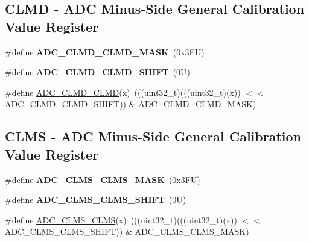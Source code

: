 \subsection*{C\+L\+MD -\/ A\+DC Minus-\/\+Side General Calibration Value Register}
\begin{DoxyCompactItemize}
\item 
\mbox{\label{group___a_d_c___register___masks_ga45c4117ad9fba213c3d338cf6280cb75}} 
\#define {\bfseries A\+D\+C\+\_\+\+C\+L\+M\+D\+\_\+\+C\+L\+M\+D\+\_\+\+M\+A\+SK}~(0x3\+F\+U)
\item 
\mbox{\label{group___a_d_c___register___masks_ga872bf108b50c6dd439ddc1294f104fe5}} 
\#define {\bfseries A\+D\+C\+\_\+\+C\+L\+M\+D\+\_\+\+C\+L\+M\+D\+\_\+\+S\+H\+I\+FT}~(0\+U)
\item 
\#define \mbox{\hyperlink{group___a_d_c___register___masks_ga8066beb7ed493b4d9964fffd3cdefd7a}{A\+D\+C\+\_\+\+C\+L\+M\+D\+\_\+\+C\+L\+MD}}(x)~(((uint32\+\_\+t)(((uint32\+\_\+t)(x)) $<$$<$ A\+D\+C\+\_\+\+C\+L\+M\+D\+\_\+\+C\+L\+M\+D\+\_\+\+S\+H\+I\+FT)) \& A\+D\+C\+\_\+\+C\+L\+M\+D\+\_\+\+C\+L\+M\+D\+\_\+\+M\+A\+SK)
\end{DoxyCompactItemize}
\subsection*{C\+L\+MS -\/ A\+DC Minus-\/\+Side General Calibration Value Register}
\begin{DoxyCompactItemize}
\item 
\mbox{\label{group___a_d_c___register___masks_ga108adc09b24001dddfd498e14213fea6}} 
\#define {\bfseries A\+D\+C\+\_\+\+C\+L\+M\+S\+\_\+\+C\+L\+M\+S\+\_\+\+M\+A\+SK}~(0x3\+F\+U)
\item 
\mbox{\label{group___a_d_c___register___masks_gabe0e92adb89c86d0523958a947288808}} 
\#define {\bfseries A\+D\+C\+\_\+\+C\+L\+M\+S\+\_\+\+C\+L\+M\+S\+\_\+\+S\+H\+I\+FT}~(0\+U)
\item 
\#define \mbox{\hyperlink{group___a_d_c___register___masks_ga83a90dcd2d54b25cc64ad18d6b9d4f07}{A\+D\+C\+\_\+\+C\+L\+M\+S\+\_\+\+C\+L\+MS}}(x)~(((uint32\+\_\+t)(((uint32\+\_\+t)(x)) $<$$<$ A\+D\+C\+\_\+\+C\+L\+M\+S\+\_\+\+C\+L\+M\+S\+\_\+\+S\+H\+I\+FT)) \& A\+D\+C\+\_\+\+C\+L\+M\+S\+\_\+\+C\+L\+M\+S\+\_\+\+M\+A\+SK)
\end{DoxyCompactItemize}
